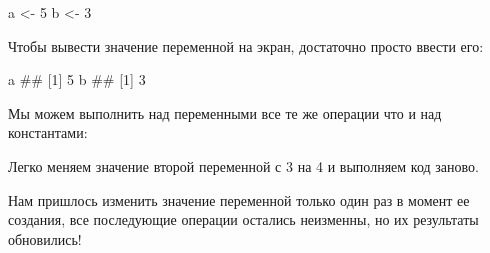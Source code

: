 \documentclass[]{book}
\newenvironment{Shaded}{\begin{snugshade}}{\end{snugshade}}
\newcommand{\DecValTok}[1]{\textcolor[rgb]{0.00,0.00,0.81}{#1}}
\newcommand{\StringTok}[1]{\textcolor[rgb]{0.31,0.60,0.02}{#1}}
\newcommand{\OperatorTok}[1]{\textcolor[rgb]{0.81,0.36,0.00}{\textbf{#1}}}
\newcommand{\NormalTok}[1]{#1}
\begin{document}
\begin{Shaded}
\begin{Highlighting}[]
\NormalTok{a <-}\StringTok{ }\DecValTok{5}
\NormalTok{b <-}\StringTok{ }\DecValTok{3}
\end{Highlighting}
\end{Shaded}

Чтобы вывести значение переменной на экран, достаточно просто ввести
его:

\begin{Shaded}
\begin{Highlighting}[]
\NormalTok{a}
\NormalTok{## [1] 5}
\NormalTok{b}
\NormalTok{## [1] 3}
\end{Highlighting}
\end{Shaded}

Мы можем выполнить над переменными все те же операции что и над
константами:

\begin{Shaded}
\end{Shaded}

Легко меняем значение второй переменной с 3 на 4 и выполняем код заново.

\begin{Shaded}
\end{Shaded}

Нам пришлось изменить значение переменной только один раз в момент ее
создания, все последующие операции остались неизменны, но их результаты
обновились!
\end{document}
